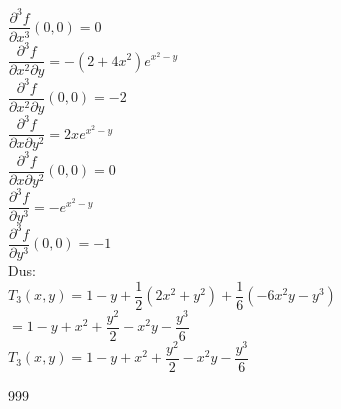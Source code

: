 \documentclass[a4paper]{article}
\begin{document}
$\dfrac{\partial^3 f}{\partial x^3}(0,0)=0$\\

$\dfrac{\partial^3 f}{\partial x^2\partial y}
=
-(2+4x^2)e^{x^2-y}$\\

$\dfrac{\partial^3 f}{\partial x^2\partial y}(0,0)=-2$\\

$\dfrac{\partial^3 f}{\partial x\partial y^2}
=
2xe^{x^2-y}$\\

$\dfrac{\partial^3 f}{\partial x\partial y^2}(0,0)=0$\\

$\dfrac{\partial^3 f}{\partial y^3}
=
-e^{x^2-y}$\\

$\dfrac{\partial^3 f}{\partial y^3}(0,0)=-1$\\

Dus:\\

$T_3(x,y)
=
1-y+\dfrac{1}{2}(2x^2+y^2)
+
\dfrac{1}{6}(-6x^2y-y^3)$\\

$=
1-y+x^2+\dfrac{y^2}{2}-x^2y-\dfrac{y^3}{6}$\\

$\boxed{
T_3(x,y)
=
1-y+x^2+\dfrac{y^2}{2}-x^2y-\dfrac{y^3}{6}
}$\\

\begin{thebibliography}{999}
\end{thebibliography}
\end{document}
